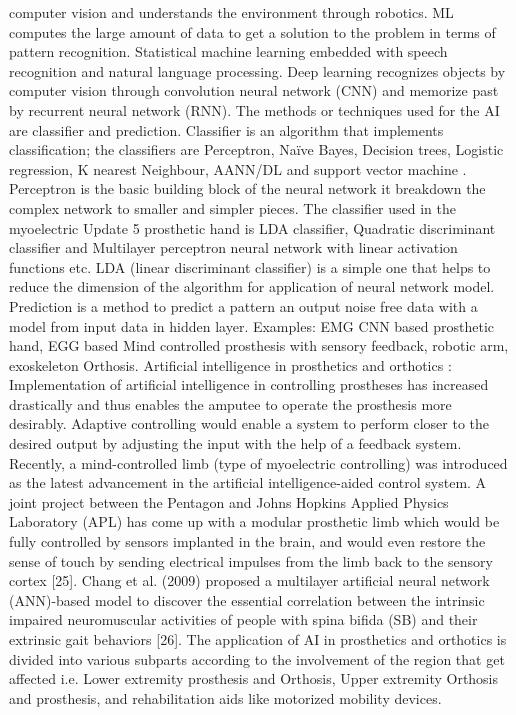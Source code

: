 \documentclass{article}
\begin{document}
computer vision and understands the environment through robotics. ML computes the 
large amount of data to get a solution to the problem in terms of pattern recognition. 
Statistical machine learning embedded with speech recognition and natural language 
processing. Deep learning recognizes objects by computer vision through convolution 
neural network (CNN) and memorize past by recurrent neural network (RNN).
The methods or techniques used for the AI are classifier and prediction. Classifier is an 
algorithm that implements classification; the classifiers are Perceptron, Naïve Bayes, 
Decision trees, Logistic regression, K nearest Neighbour, AANN/DL and support vector 
machine . Perceptron is the basic building block of the neural network it breakdown the 
complex network to smaller and simpler pieces. The classifier used in the myoelectric 
Update 5 
prosthetic hand is LDA classifier, Quadratic discriminant classifier and Multilayer 
perceptron neural network with linear activation functions etc. LDA (linear discriminant 
classifier) is a simple one that helps to reduce the dimension of the algorithm for 
application of neural network model. Prediction is a method to predict a pattern an 
output noise free data with a model from input data in hidden layer.
Examples: EMG CNN based prosthetic hand, EGG based Mind controlled prosthesis with 
sensory feedback, robotic arm, exoskeleton Orthosis.
Artificial intelligence in prosthetics and orthotics :
Implementation of artificial intelligence in controlling prostheses has increased drastically 
and thus enables the amputee to operate the prosthesis more desirably. Adaptive 
controlling would enable a system to perform closer to the desired output by adjusting 
the input with the help of a feedback system. Recently, a mind-controlled limb (type of 
myoelectric controlling) was introduced as the latest advancement in the artificial 
intelligence-aided control system. A joint project between the Pentagon and Johns 
Hopkins Applied Physics Laboratory (APL) has come up with a modular prosthetic limb 
which would be fully controlled by sensors implanted in the brain, and would even restore 
the sense of touch by sending electrical impulses from the limb back to the sensory cortex 
[25]. Chang et al. (2009) proposed a multilayer artificial neural network (ANN)-based 
model to discover the essential correlation between the intrinsic impaired neuromuscular 
activities of people with spina bifida (SB) and their extrinsic gait behaviors [26]. The 
application of AI in prosthetics and orthotics is divided into various subparts according to 
the involvement of the region that get affected i.e. Lower extremity prosthesis and 
Orthosis, Upper extremity Orthosis and prosthesis, and rehabilitation aids like motorized 
mobility devices.
\end{document}
